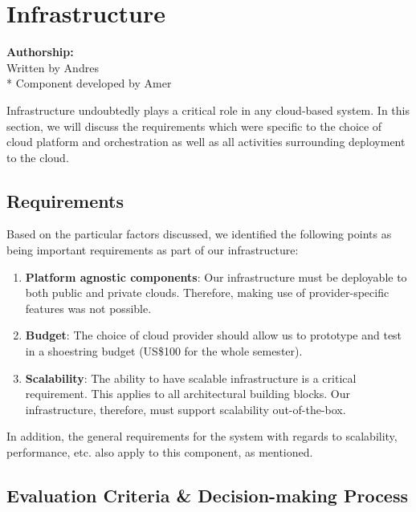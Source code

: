 \section{Infrastructure}\label{sec:infrastructure}

\vspace{8 pt}
\textbf{Authorship:}\\ Written by Andres\\*
Component developed by Amer
\vspace{12 pt}

Infrastructure undoubtedly plays a critical role in any cloud-based
system. In this section, we will discuss the requirements which were
specific to the choice of cloud platform and orchestration as well as
all activities surrounding deployment to the cloud.

\subsection{Requirements}\label{requirements}

Based on the particular factors discussed, we identified the following
points as being important requirements as part of our infrastructure:

\begin{enumerate}
\def\labelenumi{\arabic{enumi}.}
\tightlist
  \item
    \textbf{Platform agnostic components}: Our infrastructure must be
    deployable to both public and private clouds. Therefore, making use of
    provider-specific features was not possible.
  \item
    \textbf{Budget}: The choice of cloud provider should allow us to
    prototype and test in a shoestring budget (US\$100 for the whole
    semester).
  \item
    \textbf{Scalability}: The ability to have scalable infrastructure is a 
    critical requirement. This applies to all architectural building blocks.
    Our infrastructure, therefore, must support scalability out-of-the-box.
\end{enumerate}

In addition, the general requirements for the system with regards to
scalability, performance, etc. also apply to this component, as
mentioned.

\subsection{Evaluation Criteria \& Decision-making
Process}\label{evaluation-criteria-decision-making-process}

